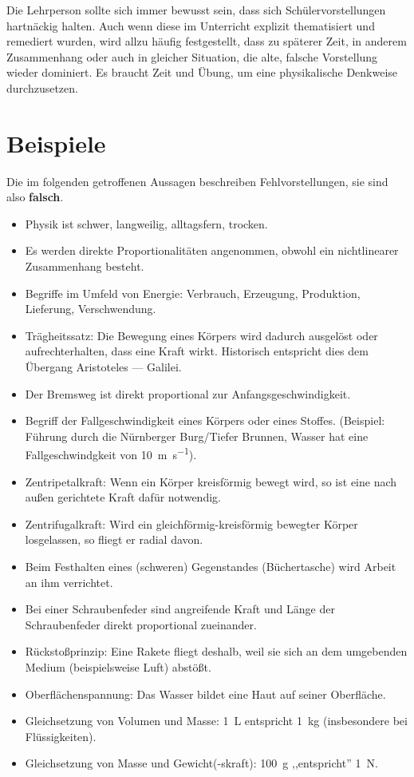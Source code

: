Die Lehrperson sollte sich immer bewusst sein, dass sich Sch\"{u}lervorstellungen hartn\"{a}ckig halten. Auch wenn diese im Unterricht explizit thematisiert und remediert wurden, wird allzu h\"{a}ufig festgestellt, dass zu sp\"{a}terer Zeit, in anderem Zusammenhang oder auch in gleicher Situation, die alte, falsche Vorstellung wieder dominiert. Es braucht Zeit und \"{U}bung, um eine physikalische Denkweise durchzusetzen.

\bip\bip
\section{Beispiele}
Die im folgenden getroffenen Aussagen beschreiben
Fehlvorstellungen, sie sind also {\bf falsch}.

\begin{itemize}
\item Physik ist schwer, langweilig, alltagsfern, trocken.
\item
Es werden direkte Proportionalit\"{a}ten angenommen, obwohl ein
nichtlinearer Zusammenhang besteht.
\item
Begriffe im Umfeld von Energie: Verbrauch, Erzeugung,
Produktion, Lieferung, Verschwendung.
\end{itemize}

\begin{itemize}
\item Tr\"{a}gheitssatz:
Die Bewegung eines K\"{o}rpers wird dadurch ausgel\"{o}st oder
aufrechterhalten, dass eine Kraft wirkt.
Historisch entspricht dies dem \"{U}bergang Aristoteles --- Galilei.
\item Der Bremsweg ist direkt proportional zur Anfangsgeschwindigkeit.
\item Begriff der Fallgeschwindigkeit eines K\"{o}rpers oder eines
Stoffes.
(Beispiel: F\"{u}hrung durch die N\"{u}rnberger Burg/Tiefer
Brunnen, Wasser hat eine Fallgeschwindgkeit von \SI{10}{\meter\per\second}).
\item Zentripetalkraft: Wenn ein K\"{o}rper kreisf\"{o}rmig bewegt wird,
so ist eine nach au{\ss}en gerichtete Kraft daf\"{u}r notwendig.
\item Zentrifugalkraft: Wird ein gleichf\"{o}rmig-kreisf\"{o}rmig bewegter K\"{o}rper losgelassen, so fliegt er radial davon.
\item
Beim Festhalten eines (schweren) Gegenstandes (B\"{u}chertasche) wird Arbeit an ihm verrichtet.
\item
Bei einer Schraubenfeder sind angreifende Kraft und L\"{a}nge der Schraubenfeder
direkt proportional zueinander.
\item R\"{u}cksto{\ss}prinzip: Eine Rakete fliegt deshalb, weil sie sich an dem umgebenden Medium (beispielsweise Luft) abst\"{o}{\ss}t.
\item
Oberfl\"{a}chenspannung: Das Wasser bildet eine Haut auf seiner Oberfl\"{a}che.
\item
Gleichsetzung von Volumen und Masse: \SI{1}{\liter} entspricht \SI{1}{\kilogram} (insbesondere bei Fl\"{u}ssigkeiten).
\item
Gleichsetzung von Masse und Gewicht(-skraft): \SI{100}{\gram} ,,entspricht'' \SI{1}{\newton}.
\end{itemize}


